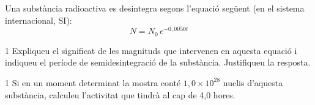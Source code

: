 Una substància radioactiva es desintegra segons l'equació següent (en el sistema internacional, SI):
\[ N = N_0\, e^{-0,0050t} \]

\begin{apartat}{1}
Expliqueu el significat de les magnituds que intervenen en aquesta equació i indiqueu el període de semidesintegració de la substància. Justifiqueu la resposta.
\end{apartat}

\begin{apartat}{1}
Si en un moment determinat la mostra conté $1,0\times 10^{28}$ nuclis d'aquesta substància, calculeu l'activitat que tindrà al cap de 4,0 hores.
\end{apartat}
